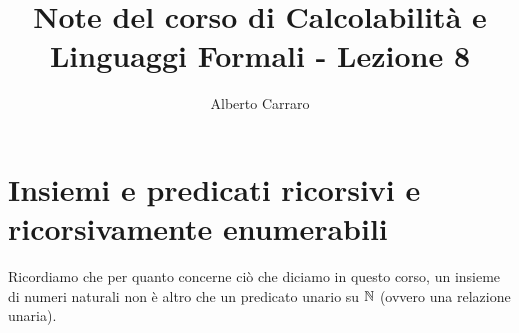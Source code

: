 \documentclass[runningheads,a4paper]{llncs}
\begin{document}
\mainmatter  %

\title{Note del corso di Calcolabilit\`{a} e Linguaggi Formali - Lezione 8}


%
%
\author{Alberto Carraro}
%


%
%




\maketitle

\section{Insiemi e predicati ricorsivi e ricorsivamente enumerabili}

Ricordiamo che per quanto concerne ci\`{o} che diciamo in questo corso, un insieme di numeri naturali non \`{e} altro che un predicato unario su $\mathbb{N}$ (ovvero una relazione unaria).
\end{document}
